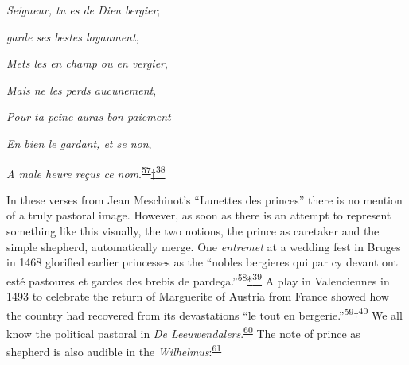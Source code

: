 \emph{Seigneur, tu es de Dieu bergier};

\emph{garde ses bestes loyaument},

\emph{Mets les en champ ou en vergier},

\emph{Mais ne les perds aucunement},

\emph{Pour ta peine auras bon paiement}

\emph{En bien le gardant, et se non},

\emph{A male heure reçus ce
nom}.\textsuperscript{\protect\hypertarget{11_Chapter_Four__THE_FORMS_OF_LOVE.xhtmlux5cux23id_1375}{\protect\hyperlink{23_NOTES.xhtmlux5cux23id_1376}{57}}}\protect\hypertarget{11_Chapter_Four__THE_FORMS_OF_LOVE.xhtmlux5cux23id_2931}{\protect\hyperlink{23_NOTES.xhtmlux5cux23id_2932}{†\textsuperscript{38}}}

\protect\hypertarget{11_Chapter_Four__THE_FORMS_OF_LOVE.xhtmlux5cux23page_153}{}{}In
these verses from Jean Meschinot's ``Lunettes des princes'' there is no
mention of a truly pastoral image. However, as soon as there is an
attempt to represent something like this visually, the two notions, the
prince as caretaker and the simple shepherd, automatically merge. One
\emph{entremet} at a wedding fest in Bruges in 1468 glorified earlier
princesses as the ``nobles bergieres qui par cy devant ont esté
pastoures et gardes des brebis de
pardeça.''\textsuperscript{\protect\hypertarget{11_Chapter_Four__THE_FORMS_OF_LOVE.xhtmlux5cux23id_1373}{\protect\hyperlink{23_NOTES.xhtmlux5cux23id_1374}{58}}}\protect\hypertarget{11_Chapter_Four__THE_FORMS_OF_LOVE.xhtmlux5cux23id_2933}{\protect\hyperlink{23_NOTES.xhtmlux5cux23id_2934}{*\textsuperscript{39}}}
A play in Valenciennes in 1493 to celebrate the return of Marguerite of
Austria from France showed how the country had recovered from its
devastations ``le tout en
bergerie.''\textsuperscript{\protect\hypertarget{11_Chapter_Four__THE_FORMS_OF_LOVE.xhtmlux5cux23id_1371}{\protect\hyperlink{23_NOTES.xhtmlux5cux23id_1372}{59}}}\protect\hypertarget{11_Chapter_Four__THE_FORMS_OF_LOVE.xhtmlux5cux23id_2935}{\protect\hyperlink{23_NOTES.xhtmlux5cux23id_2936}{†\textsuperscript{40}}}
We all know the political pastoral in \emph{De
Leeuwendalers}.\textsuperscript{\protect\hypertarget{11_Chapter_Four__THE_FORMS_OF_LOVE.xhtmlux5cux23id_1369}{\protect\hyperlink{23_NOTES.xhtmlux5cux23id_1370}{60}}}
The note of prince as shepherd is also audible in the
\emph{Wilhelmus}:\textsuperscript{\protect\hypertarget{11_Chapter_Four__THE_FORMS_OF_LOVE.xhtmlux5cux23id_1367}{\protect\hyperlink{23_NOTES.xhtmlux5cux23id_1368}{61}}}

